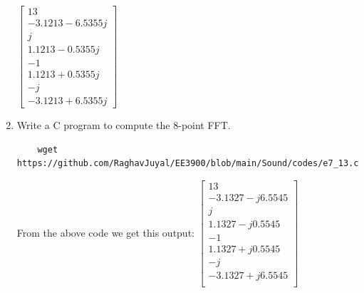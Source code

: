 \documentclass[journal,12pt,twocolumn]{IEEEtran}
\renewcommand\thesection{\arabic{section}}
\begin{document}
\begin{enumerate}[label=\arabic*.,ref=\thesection.\theenumi]
$\begin{bmatrix}
	13\\
	-3.1213-6.5355j\\
	j\\
	1.1213-0.5355j\\
	-1\\
	1.1213+0.5355j\\
	-j\\
	-3.1213+6.5355j
\end{bmatrix}$
\item Write a C program to compute the 8-point FFT. \\
\solution
\begin{lstlisting}
	wget https://github.com/RaghavJuyal/EE3900/blob/main/Sound/codes/e7_13.c
\end{lstlisting}
From the above code we get this output:
$\begin{bmatrix}
	13\\
	-3.1327 - j6.5545\\
	j\\
	1.1327 - j0.5545\\
	-1\\
	1.1327 + j0.5545\\
	- j\\
	-3.1327 + j6.5545\\
\end{bmatrix}$
\vspace{1cm}
\end{enumerate}
\end{document}
